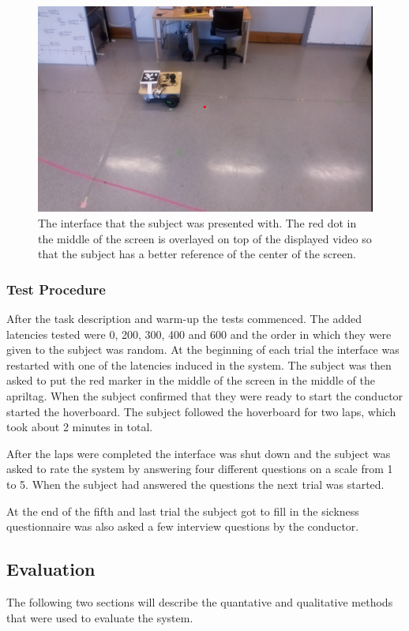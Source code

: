 \documentclass[nofilelist]{cslthse-msc}
\begin{document}
\begin{figure}[!hbt]
   \centering
   \includegraphics[scale=0.3]{images/interface.png} 
   \caption{The interface that the subject was presented with. The red dot in the middle of the screen is overlayed on top of the displayed video so that the subject has a better reference of the center of the screen.}
   \label{fig:interface}
\end{figure}

\subsubsection{Test Procedure}
After the task description and warm-up the tests commenced. The added latencies tested were 0, 200, 300, 400 and 600 and the order in which they were given to the subject was random. 
At the beginning of each trial the interface was restarted with one of the latencies induced in the system. The subject was then asked to put the red marker in the middle of the screen in the middle of the apriltag. When the subject confirmed that they were ready to start the conductor started the hoverboard. The subject followed the hoverboard for two laps, which took about 2 minutes in total.

After the laps were completed the interface was shut down and the subject was asked to rate the system by answering four different questions on a scale from 1 to 5. When the subject had answered the questions the next trial was started.

At the end of the fifth and last trial the subject got to fill in the sickness questionnaire was also asked a few interview questions by the conductor.

\subsection{Evaluation}
The following two sections will describe the quantative and qualitative methods that were used to evaluate the system.
\end{document}

